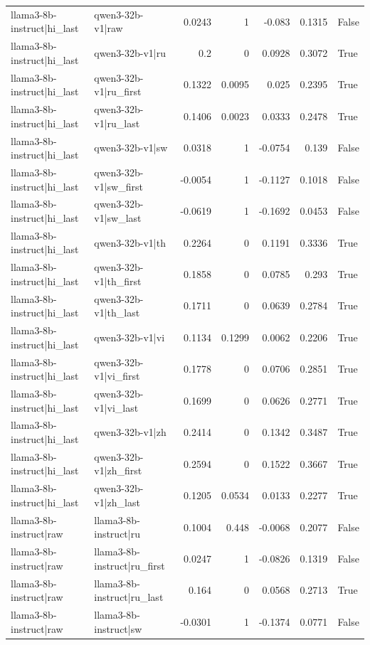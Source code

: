 \begin{table}
\begin{tabular}{l l r r r r l}
llama3-8b-instruct|hi_last & qwen3-32b-v1|raw & 0.0243 & 1 & -0.083 & 0.1315 & False \\
llama3-8b-instruct|hi_last & qwen3-32b-v1|ru & 0.2 & 0 & 0.0928 & 0.3072 & True \\
llama3-8b-instruct|hi_last & qwen3-32b-v1|ru_first & 0.1322 & 0.0095 & 0.025 & 0.2395 & True \\
llama3-8b-instruct|hi_last & qwen3-32b-v1|ru_last & 0.1406 & 0.0023 & 0.0333 & 0.2478 & True \\
llama3-8b-instruct|hi_last & qwen3-32b-v1|sw & 0.0318 & 1 & -0.0754 & 0.139 & False \\
llama3-8b-instruct|hi_last & qwen3-32b-v1|sw_first & -0.0054 & 1 & -0.1127 & 0.1018 & False \\
llama3-8b-instruct|hi_last & qwen3-32b-v1|sw_last & -0.0619 & 1 & -0.1692 & 0.0453 & False \\
llama3-8b-instruct|hi_last & qwen3-32b-v1|th & 0.2264 & 0 & 0.1191 & 0.3336 & True \\
llama3-8b-instruct|hi_last & qwen3-32b-v1|th_first & 0.1858 & 0 & 0.0785 & 0.293 & True \\
llama3-8b-instruct|hi_last & qwen3-32b-v1|th_last & 0.1711 & 0 & 0.0639 & 0.2784 & True \\
llama3-8b-instruct|hi_last & qwen3-32b-v1|vi & 0.1134 & 0.1299 & 0.0062 & 0.2206 & True \\
llama3-8b-instruct|hi_last & qwen3-32b-v1|vi_first & 0.1778 & 0 & 0.0706 & 0.2851 & True \\
llama3-8b-instruct|hi_last & qwen3-32b-v1|vi_last & 0.1699 & 0 & 0.0626 & 0.2771 & True \\
llama3-8b-instruct|hi_last & qwen3-32b-v1|zh & 0.2414 & 0 & 0.1342 & 0.3487 & True \\
llama3-8b-instruct|hi_last & qwen3-32b-v1|zh_first & 0.2594 & 0 & 0.1522 & 0.3667 & True \\
llama3-8b-instruct|hi_last & qwen3-32b-v1|zh_last & 0.1205 & 0.0534 & 0.0133 & 0.2277 & True \\
llama3-8b-instruct|raw & llama3-8b-instruct|ru & 0.1004 & 0.448 & -0.0068 & 0.2077 & False \\
llama3-8b-instruct|raw & llama3-8b-instruct|ru_first & 0.0247 & 1 & -0.0826 & 0.1319 & False \\
llama3-8b-instruct|raw & llama3-8b-instruct|ru_last & 0.164 & 0 & 0.0568 & 0.2713 & True \\
llama3-8b-instruct|raw & llama3-8b-instruct|sw & -0.0301 & 1 & -0.1374 & 0.0771 & False \\

\end{tabular}
\end{table}
